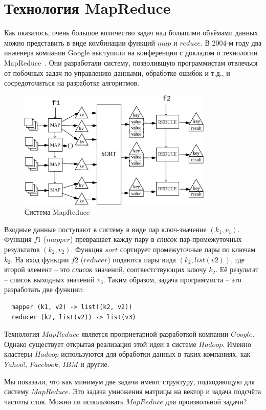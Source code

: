 \documentclass[a4paper,11pt]{article}
\begin{document}
\section{Технология MapReduce}
Как оказалось, очень большое количество задач над большими объёмами данных
можно представить в виде комбинации функций $map$ и $reduce$. В 2004-м году
два инженера компании Google выступили на конференции с докладом о технологии
MapReduce~\cite{Dean04mapreduce:simplified}. Они разработали систему,
позволившую программистам отвлечься от побочных задач по управлению данными,
обработке ошибок и т.д., и сосредоточиться на разработке алгоритмов.
\begin{figure}[h]
    \begin{center}
        \includegraphics[width=350px]{lecture9/mapreduce.eps}
        \caption{Система MapReduce}
    \end{center}
\end{figure}
Входные данные поступают в систему в виде пар ключ-значение $(k_1, v_1)$.
Функция $f1$ ($mapper$) превращает кажду пару в \emph{список} пар-промежуточных
результатов $(k_2, v_2)$. Функция $sort$ сортирует промежуточные пары по
ключам $k_2$. На вход функции $f2$ ($reducer$) подаются пары вида 
$(k_2, list(v2))$, где второй элемент -- это \emph{список} значений,
соотвестствующих ключу $k_2$. Её результат -- список выходных значений $v_3$.
Таким образом, задача программиста -- это разработать две функции:
\begin{lstlisting}
  mapper (k1, v2) -> list((k2, v2))
  reducer (k2, list(v2)) -> list(v3)
\end{lstlisting}

Технология $MapReduce$ является проприетарной разработкой компании $Google$.
Однако существует открытая реализация этой идеи в системе $Hadoop$. Именно
кластеры $Hadoop$ используются для обработки данных в таких компаниях, как
$Yahoo!$, $Facebook$, $IBM$ и другие.

Мы показали, что как минимум две задачи имеют структуру, подходяющую для
систему $MapReduce$. Это задача умножения матрицы на вектор и задача
подсчёта частоты слов. Можно ли использовать $MapReduce$ для произвольной
задачи?
\end{document}
